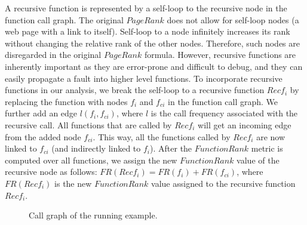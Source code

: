 A recursive function is represented by a self-loop to the recursive node in the function call graph.
The original $PageRank$ does not allow for self-loop nodes (\ie a web page with a link to itself).
Self-loop to a node infinitely increases its rank without changing the relative rank of the other
nodes. Therefore, such nodes are disregarded in the original $PageRank$ formula. 
However, recursive functions are inherently important as they are error-prone and difficult to debug, and they can easily propagate a fault into higher level functions. To incorporate recursive functions in our analysis, we break the self-loop to a recursive function $Recf_i$ by replacing the function with nodes $f_i$ and $f_{ci}$ in the function call graph. We further add an edge $l(f_i,f_{ci})$, where $l$ is the call frequency associated with the recursive call. 
All functions that are called by $Recf_i$ will get an incoming edge from the added node $f_{ci}$.  
This way,  all the functions called by $Recf_i$ are now linked to $f_{ci}$ (and indirectly linked to $f_i$).
After the $FunctionRank$ metric is computed over all functions, we assign the new $FunctionRank$ value of the recursive node as follows: 
$FR(Recf_i)=FR(f_i)+FR(f_{ci})$, where $FR(Recf_i)$ is the new $FunctionRank$ value assigned to the recursive function $Recf_i$. %

\begin{figure} [tp]
\centering
{}
\vspace{0.2in}             
\caption{Call graph of the running example.}
\label{Fig:exampleGraph}
\end{figure}
 
